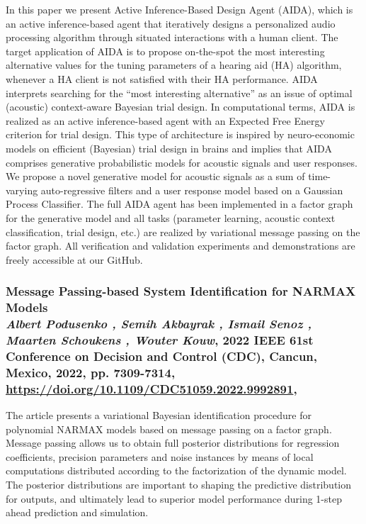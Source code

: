 In this paper we present Active Inference-Based Design Agent (AIDA), which is an active
inference-based agent that iteratively designs a personalized audio processing algorithm
through situated interactions with a human client.
The target application of AIDA is to propose on-the-spot the most interesting alternative
values for the tuning parameters of a hearing aid (HA) algorithm, whenever a HA client is not
satisfied with their HA performance.
AIDA interprets searching for the “most interesting alternative” as an issue of optimal
(acoustic) context-aware Bayesian trial design.
In computational terms, AIDA is realized as an active inference-based agent with an Expected
Free Energy criterion for trial design.
This type of architecture is inspired by neuro-economic models on efficient (Bayesian) trial
design in brains and implies that AIDA comprises generative probabilistic models for acoustic
signals and user responses.
We propose a novel generative model for acoustic signals as a sum of time-varying
auto-regressive filters and a user response model based on a Gaussian Process Classifier.
The full AIDA agent has been implemented in a factor graph for the generative model and all
tasks (parameter learning, acoustic context classification, trial design, etc.) are realized
by variational message passing on the factor graph.
All verification and validation experiments and demonstrations are freely accessible at our
GitHub.

\subsubsection*{Message Passing-based System Identification for NARMAX Models\\{\small \normalfont \textit{Albert Podusenko , Semih Akbayrak , Ismail Senoz , Maarten Schoukens , Wouter Kouw}, 2022 IEEE 61st Conference on Decision and Control (CDC), Cancun, Mexico, 2022, pp. 7309-7314, \url{https://doi.org/10.1109/CDC51059.2022.9992891}, \citep{semih_akbayrak_podusenkoakbayrak-2022-cdc_nodate}}}

The article presents a variational Bayesian identification procedure for polynomial NARMAX
models based on message passing on a factor graph.
Message passing allows us to obtain full posterior distributions for regression coefficients,
precision parameters and noise instances by means of local computations distributed according
to the factorization of the dynamic model.
The posterior distributions are important to shaping the predictive distribution for outputs,
and ultimately lead to superior model performance during 1-step ahead prediction and
simulation.

